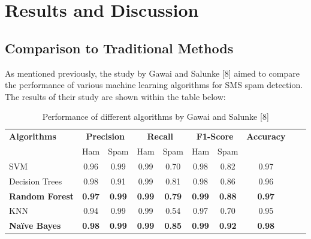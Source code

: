 \documentclass{article}
\begin{document}




\section{Results and Discussion}
\subsection{Comparison to Traditional Methods}

\noindent
As mentioned previously, the study by Gawai and Salunke [8] aimed to compare the performance of various machine learning algorithms for SMS spam detection. The results of their study are shown within the table below:

\begin{table}[htbp]
    \centering
    \caption{Performance of different algorithms by Gawai and Salunke [8]} %
    \label{tab:performance} %
    
    \begin{tabular}{l cccc cccc c}
    \toprule
    \textbf{Algorithms} & \multicolumn{2}{c}{\textbf{Precision}} & \multicolumn{2}{c}{\textbf{Recall}} & \multicolumn{2}{c}{\textbf{F1-Score}} & \textbf{Accuracy} \\
    \cmidrule(lr){2-3} \cmidrule(lr){4-5} \cmidrule(lr){6-7}
    & Ham & Spam & Ham & Spam & Ham & Spam & \\
    \midrule
    SVM & 0.96 & 0.99 & 0.99 & 0.70 & 0.98 & 0.82 & 0.97 \\
    Decision Trees & 0.98 & 0.91 & 0.99 & 0.81 & 0.98 & 0.86 & 0.96 \\
    \textbf{Random Forest} & \textbf{0.97} & \textbf{0.99} & \textbf{0.99} & \textbf{0.79} & \textbf{0.99} & \textbf{0.88} & \textbf{0.97} \\
    KNN & 0.94 & 0.99 & 0.99 & 0.54 & 0.97 & 0.70 & 0.95 \\
    \textbf{Naïve Bayes} & \textbf{0.98} & \textbf{0.99} & \textbf{0.99} & \textbf{0.85} & \textbf{0.99} & \textbf{0.92} & \textbf{0.98} \\
    \bottomrule
    \end{tabular}
\end{table}
\end{document}
